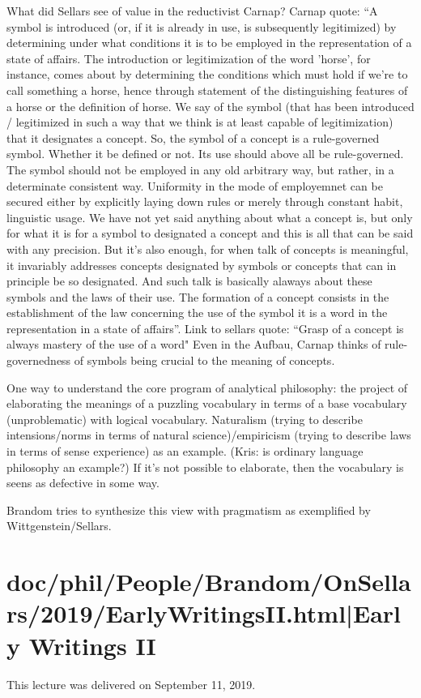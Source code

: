 \documentclass[12pt,a4paper]{report}
\begin{document}
What did Sellars see of value in the reductivist Carnap? Carnap quote: ``A symbol is introduced (or, if it is already in use, is subsequently legitimized) by determining under what conditions it is to be employed in the representation of a state of affairs. The introduction or legitimization of the word 'horse', for instance, comes about by determining the conditions which must hold if we're to call something a horse, hence through statement of the distinguishing features of a horse or the definition of horse. We say of the symbol (that has been introduced / legitimized in such a way that we think is at least capable of legitimization) that it designates a concept. So, the symbol of a concept is a rule-governed symbol. Whether it be defined or not. Its use should above all be rule-governed. The symbol should not be employed in any old arbitrary way, but rather, in a determinate consistent way. Uniformity in the mode of employemnet can be secured either by explicitly laying down rules or merely through constant habit, linguistic usage. We have not yet said anything about what a concept is, but only for what it is for a symbol to designated a concept and this is all that can be said with any precision. But it's also enough, for when talk of concepts is meaningful, it invariably addresses concepts designated by symbols or concepts that can in principle be so designated. And such talk is basically alaways about these symbols and the laws of their use. The formation of a concept consists in the establishment of the law concerning the use of the symbol it is a word in the representation in a state of affairs''. Link to sellars quote: ``Grasp of a concept is always mastery of the use of a word" Even in the Aufbau, Carnap thinks of rule-governedness of symbols being crucial to the meaning of concepts.

One way to understand the core program of analytical philosophy: the project of elaborating the meanings of a puzzling vocabulary in terms of a base vocabulary (unproblematic) with logical vocabulary. Naturalism (trying to describe intensions/norms in terms of natural science)/empiricism (trying to describe laws in terms of sense experience) as an example. (Kris: is ordinary language philosophy an example?) If it's not possible to elaborate, then the vocabulary is seens as defective in some way.

Brandom tries to synthesize this view with pragmatism as exemplified by Wittgenstein/Sellars.
\part{doc/phil/People/Brandom/OnSellars/2019/EarlyWritingsII.html|Early Writings II}
This lecture was delivered on September 11, 2019.
\end{document}
